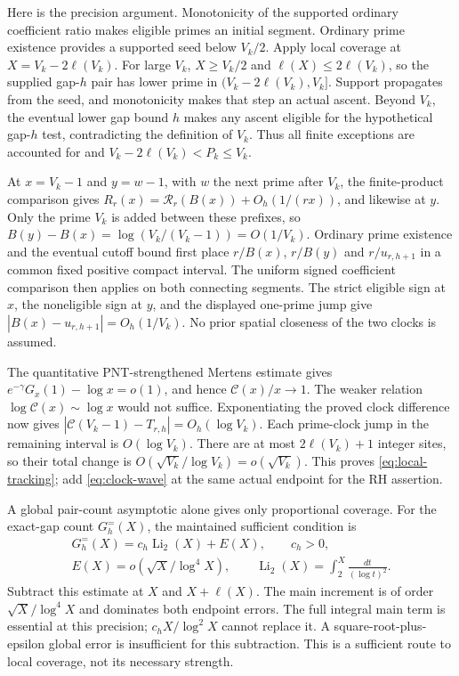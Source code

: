 \documentclass[11pt]{article}
\theoremstyle{definition}
\begin{document}
Here is the precision argument. Monotonicity of the supported
ordinary coefficient ratio makes eligible primes an initial segment.
Ordinary prime existence provides a supported seed below $V_k/2$.
Apply local coverage at $X=V_k-2\ell(V_k)$. For large $V_k$,
$X\ge V_k/2$ and $\ell(X)\le2\ell(V_k)$, so the supplied gap-$h$
pair has lower prime in $(V_k-2\ell(V_k),V_k]$. Support propagates
from the seed, and monotonicity makes that step an actual ascent.
Beyond $V_k$, the eventual lower gap bound $h$ makes any ascent
eligible for the hypothetical gap-$h$ test, contradicting the
definition of $V_k$. Thus all finite exceptions are accounted for and
$V_k-2\ell(V_k)<P_k\le V_k$.

At $x=V_k-1$ and $y=w-1$, with $w$ the next prime after $V_k$,
the finite-product comparison gives
$R_r(x)=\mathcal R_r(B(x))+O_h(1/(rx))$, and likewise at $y$.
Only the prime $V_k$ is added between these prefixes, so
$B(y)-B(x)=\log(V_k/(V_k-1))=O(1/V_k)$.
Ordinary prime existence and the eventual cutoff bound first place
$r/B(x)$, $r/B(y)$ and $r/u_{r,h+1}$ in a common fixed positive
compact interval. The uniform signed coefficient comparison then
applies on both connecting segments. The strict eligible sign at
$x$, the noneligible sign at $y$, and the displayed one-prime jump give
$|B(x)-u_{r,h+1}|=O_h(1/V_k)$.
No prior spatial closeness of the two clocks is assumed.

The quantitative PNT-strengthened Mertens estimate gives
$e^{-\gamma}G_x(1)-\log x=o(1)$, and hence $\mathcal C(x)/x\to1$.
The weaker relation $\log\mathcal C(x)\sim\log x$ would not suffice.
Exponentiating the proved clock difference now gives
$|\mathcal C(V_k-1)-T_{r,h}|=O_h(\log V_k)$.
Each prime-clock jump in the remaining interval is $O(\log V_k)$.
There are at most $2\ell(V_k)+1$ integer sites, so their total change
is $O(\sqrt{V_k}/\log V_k)=o(\sqrt{V_k})$.
This proves \eqref{eq:local-tracking}; add \eqref{eq:clock-wave}
at the same actual endpoint for the RH assertion.

A global pair-count asymptotic alone gives only proportional coverage.
For the exact-gap count $G_h^{=}(X)$, the maintained sufficient condition is
\[
 \begin{gathered}
 G_h^{=}(X)=c_h\operatorname{Li}_2(X)+E(X),\qquad c_h>0,\\
 E(X)=o(\sqrt X/\log^4X),\qquad
 \operatorname{Li}_2(X)=\int_2^X\frac{dt}{(\log t)^2}.
 \end{gathered}
\]
Subtract this estimate at $X$ and $X+\ell(X)$. The main increment is
of order $\sqrt X/\log^4X$ and dominates both endpoint errors.
The full integral main term is essential at this precision;
$c_hX/\log^2X$ cannot replace it. A square-root-plus-epsilon
global error is insufficient for this subtraction.
This is a sufficient route to local coverage, not its necessary strength.
\end{document}
